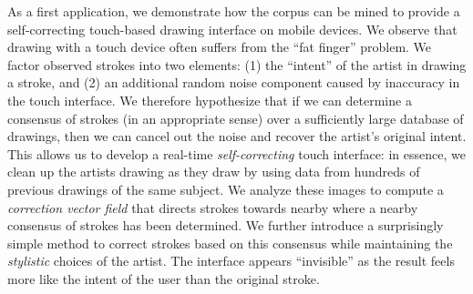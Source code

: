 As a first application, we demonstrate how the \daf corpus can be
mined to provide a self-correcting touch-based drawing interface on
mobile devices. We observe that drawing with a touch device often
suffers from the ``fat finger'' problem. We factor observed strokes
into two elements: (1) the ``intent'' of the artist in drawing a
stroke, and (2) an additional random noise component caused by
inaccuracy in the touch interface. We therefore hypothesize that if
we can determine a consensus of strokes (in an appropriate sense)
over a sufficiently large database of drawings, then we can cancel
out the noise and recover the artist's original intent. This allows
us to develop a real-time {\em self-correcting} touch interface: in
essence, we clean up the artists drawing as they draw by using data
from hundreds of previous drawings of the same subject. We analyze
these images to compute a \emph{correction vector field} that
directs strokes towards nearby where a nearby consensus of strokes
has been determined. We further introduce a surprisingly simple
method to correct strokes based on this consensus while maintaining
the {\em stylistic} choices of the artist. The interface appears
``invisible'' as the result feels more like the intent of the user
than the original stroke.

% 













